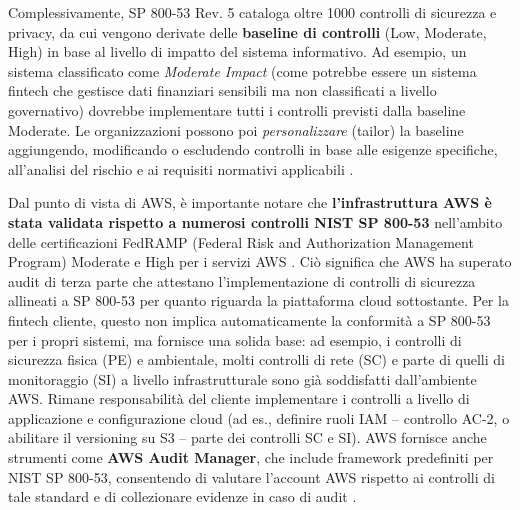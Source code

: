 Complessivamente, SP 800-53 Rev. 5 cataloga oltre 1000 controlli di sicurezza e privacy, da cui vengono derivate delle \textbf{baseline di controlli} (Low, Moderate, High) in base al livello di impatto del sistema informativo. Ad esempio, un sistema classificato come \textit{Moderate Impact} (come potrebbe essere un sistema fintech che gestisce dati finanziari sensibili ma non classificati a livello governativo) dovrebbe implementare tutti i controlli previsti dalla baseline Moderate. Le organizzazioni possono poi \textit{personalizzare} (tailor) la baseline aggiungendo, modificando o escludendo controlli in base alle esigenze specifiche, all'analisi del rischio e ai requisiti normativi applicabili .

Dal punto di vista di AWS, è importante notare che \textbf{l'infrastruttura AWS è stata validata rispetto a numerosi controlli NIST SP 800-53} nell'ambito delle certificazioni FedRAMP (Federal Risk and Authorization Management Program) Moderate e High per i servizi AWS \cite{awsNistCompliance}. Ciò significa che AWS ha superato audit di terza parte che attestano l'implementazione di controlli di sicurezza allineati a SP 800-53 per quanto riguarda la piattaforma cloud sottostante. Per la fintech cliente, questo non implica automaticamente la conformità a SP 800-53 per i propri sistemi, ma fornisce una solida base: ad esempio, i controlli di sicurezza fisica (PE) e ambientale, molti controlli di rete (SC) e parte di quelli di monitoraggio (SI) a livello infrastrutturale sono già soddisfatti dall'ambiente AWS. Rimane responsabilità del cliente implementare i controlli a livello di applicazione e configurazione cloud (ad es., definire ruoli IAM – controllo AC-2, o abilitare il versioning su S3 – parte dei controlli SC e SI). AWS fornisce anche strumenti come \textbf{AWS Audit Manager}, che include framework predefiniti per NIST SP 800-53, consentendo di valutare l'account AWS rispetto ai controlli di tale standard e di collezionare evidenze in caso di audit \cite{awsAuditManager}.

